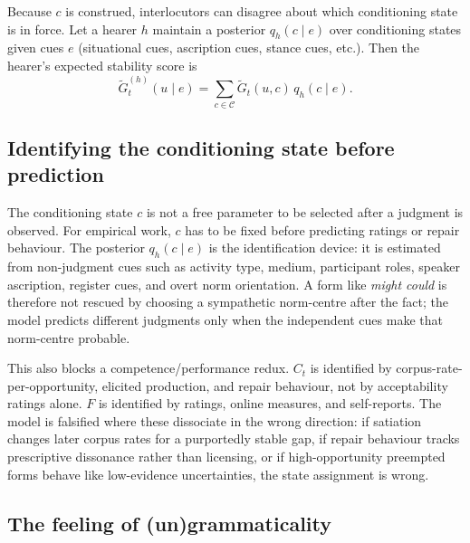 \documentclass[12pt,letterpaper]{article}
\newcommand{\mention}[1]{\textit{#1}}
\begin{document}
Because $c$ is construed, interlocutors can disagree about which conditioning state is
in force.  Let a hearer $h$ maintain a posterior $q_h(c\mid e)$ over conditioning states
given cues $e$ (situational cues, ascription cues, stance cues, etc.).  Then the hearer's
expected stability score is
\begin{equation*}
\widetilde{G}^{(h)}_t(u\mid e)=\sum_{c\in\mathcal{C}} \widetilde{G}_t(u,c)\,q_h(c\mid e).
\end{equation*}

\subsection{Identifying the conditioning state before prediction}
\label{sec:identification-c}

The conditioning state $c$ is not a free parameter to be selected after a
judgment is observed. For empirical work, $c$ has to be fixed before predicting
ratings or repair behaviour. The posterior $q_h(c\mid e)$ is the identification
device: it is estimated from non-judgment cues such as activity type, medium,
participant roles, speaker ascription, register cues, and overt norm
orientation. A form like \mention{might could} is therefore not rescued by
choosing a sympathetic norm-centre after the fact; the model predicts different
judgments only when the independent cues make that norm-centre probable.

This also blocks a competence/performance redux. $C_t$ is identified by
corpus-rate-per-opportunity, elicited production, and repair behaviour, not by
acceptability ratings alone. $F$ is identified by ratings, online measures, and
self-reports. The model is falsified where these dissociate in the wrong
direction: if satiation changes later corpus rates for a purportedly stable gap,
if repair behaviour tracks prescriptive dissonance rather than licensing, or if
high-opportunity preempted forms behave like low-evidence uncertainties, the
state assignment is wrong.

\subsection{The feeling of (un)grammaticality}
\label{sec:feeling-new}
\end{document}
